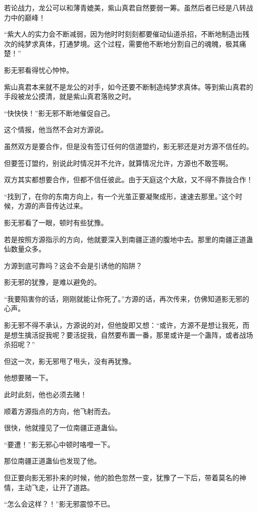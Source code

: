 \begin{this_body}
若论战力，龙公可以和薄青媲美，紫山真君自然要弱一筹。虽然后者已经是八转战力中的巅峰！

“紫大人的实力会不断减弱，因为他时时刻刻都要催动仙道杀招，不断地制造出残次的纯梦求真体，打通梦境。这个过程，需要他不断地分割自己的魂魄，极其痛楚！”

影无邪看得忧心忡忡。

紫山真君本来就不是龙公的对手，如今还要不断制造纯梦求真体。等到紫山真君的手段被龙公摸清，就是紫山真君落败之时。

“快快快！”影无邪不断地催促自己。

这个情报，他当然不会对方源说。

虽然双方是要合作，但是没有签订任何的信道盟约，影无邪还是对方源不信任的。

但要签订盟约，别说此时情况并不允许，就算情况允许，方源也不敢签啊。

双方其实都想要合作，但都不信任彼此。由于天庭这个大敌，又不得不靠拢合作！

“找到了，在你的东南方向上，有一个光茧正要凝聚成形，速速去那里。”这个时候，方源的声音传达过来。

影无邪看了一眼，顿时有些犹豫。

若是按照方源指示的方向，他就要深入到南疆正道的腹地中去。那里的南疆正道蛊仙数量众多。

方源到底可靠吗？这会不会是引诱他的陷阱？

影无邪的犹豫，是难以避免的。

“我要陷害你的话，刚刚就能让你死了。”方源的话，再次传来，仿佛知道影无邪的心声。

影无邪不得不承认，方源说的对，但他旋即又想：“或许，方源不是想让我死，而是想生擒活捉我呢？要活捉我，自然要布置一番，那里或许是一个蛊阵，或者战场杀招呢？”

但这一次，影无邪甩了甩头，没有再犹豫。

他想要赌一下。

此时此刻，他也必须去赌！

顺着方源指点的方向，他飞射而去。

很快，他就撞见了一位南疆正道蛊仙。

“要遭！”影无邪心中顿时咯噔一下。

那位南疆正道蛊仙也发现了他。

但正要向影无邪扑来的时候，他的脸色忽然一变，犹豫了一下后，带着莫名的神情，主动飞走，让开了道路。

“怎么会这样？！”影无邪震惊不已。


\end{this_body}
